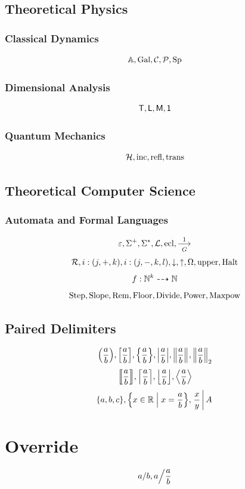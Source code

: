 \documentclass{article}
\begin{document}
\subsection{Theoretical Physics}

\subsubsection{Classical Dynamics}
\[
    \mathbb{A}, \operatorname{Gal}, \mathcal{C}, \mathcal{P}, \operatorname{Sp}
\]

\subsubsection{Dimensional Analysis}
\[
    \mathsf{T}, \mathsf{L}, \mathsf{M}, \mathsf{1}
\]

\subsubsection{Quantum Mechanics}
\[
    \mathcal{H}, \text{inc}, \text{refl}, \text{trans}
\]

\subsection{Theoretical Computer Science}

\subsubsection{Automata and Formal Languages}
\[
    \emptyword, \Sigma\kplus, \Sigma\kstar, \langacc, \ecl, \prodrule[1][G]
\]
\[
    \registerMachine, \sPlus{i}{j}{k}, \sMinus{i}{j}{k}{l}, \halt, \nothalt, \haltingSet, \upper, \Halt
\]
\[
    f: \mathbb{N}^k \dashrightarrow \mathbb{N}
\]
\[
    \operatorname{Step}, \operatorname{Slope}, \operatorname{Rem}, \operatorname{Floor}, \operatorname{Divide}, \operatorname{Power}, \operatorname{Maxpow}
\]

\subsection{Paired Delimiters}
\[
    \pqty{\frac{a}{b}}, \bqty{\frac{a}{b}}, \Bqty{\frac{a}{b}}, \abs{\frac{a}{b}}, \norm{\frac{a}{b}}, \norm[2]{\frac{a}{b}}
\]
\[
    \bbrac{\frac{a}{b}}, \ceil{\frac{a}{b}}, \floor{\frac{a}{b}}, \angBrac{\frac{a}{b}}
\]
\[
    \set{a, b, c}, \set{x \in \RR}{x = \frac{a}{b}}, \bound{\Conditional{\frac{x}{y}}{A}}
\]

\section{Override}
\[
    \flatfrac{a}{b}, \flatfrac{a}{\frac{a}{b}}
\]
\end{document}
